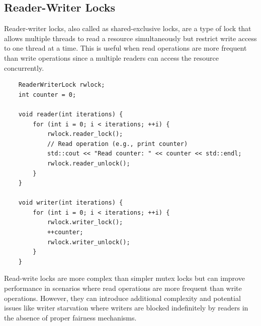 

\subsection{Reader-Writer Locks}
Reader-writer locks, also called as shared-exclusive locks, are a type of lock that allows multiple threads to read a resource simultaneously but restrict write access to one thread at a time. This is useful when read operations are more frequent than write operations since a multiple readers can access the resource concurrently.

\begin{lstlisting}
    ReaderWriterLock rwlock;
    int counter = 0;

    void reader(int iterations) {
        for (int i = 0; i < iterations; ++i) {
            rwlock.reader_lock();
            // Read operation (e.g., print counter)
            std::cout << "Read counter: " << counter << std::endl;
            rwlock.reader_unlock();
        }
    }

    void writer(int iterations) {
        for (int i = 0; i < iterations; ++i) {
            rwlock.writer_lock();
            ++counter;
            rwlock.writer_unlock();
        }
    }
\end{lstlisting}

Read-write locks are more complex than simpler mutex locks but can improve performance in scenarios where read operations are more frequent than write operations. However, they can introduce additional complexity and potential issues like writer starvation where writers are blocked indefinitely by readers in the absence of proper fairness mechanisms.





